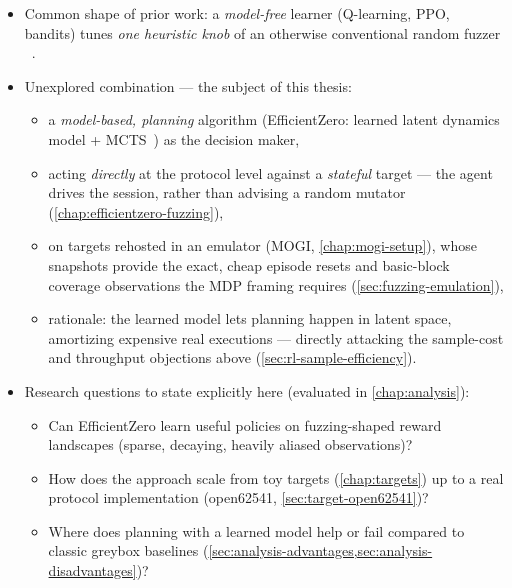 \begin{itemize}
  \item Common shape of prior work: a \emph{model-free} learner (Q-learning, PPO, bandits) tunes
    \emph{one heuristic knob} of an otherwise conventional random fuzzer
    ~\cite{bottinger_deep_2018,binosi_rainfuzz_2023,wang_reinforcement_2021,wang_syzvegas_2021,christakis_banditfuzz_2020}.
  \item Unexplored combination --- the subject of this thesis:
    \begin{itemize}
      \item a \emph{model-based, planning} algorithm (EfficientZero: learned latent dynamics
        model + MCTS~\cite{ye_mastering_2021,schrittwieser_mastering_2020}) as the decision maker,
      \item acting \emph{directly} at the protocol level against a \emph{stateful} target ---
        the agent drives the session, rather than advising a random mutator
        (\cref{chap:efficientzero-fuzzing}),
      \item on targets rehosted in an emulator (MOGI, \cref{chap:mogi-setup}), whose snapshots
        provide the exact, cheap episode resets and basic-block coverage observations the MDP
        framing requires (\cref{sec:fuzzing-emulation}),
      \item rationale: the learned model lets planning happen in latent space, amortizing
        expensive real executions --- directly attacking the sample-cost and throughput
        objections above (\cref{sec:rl-sample-efficiency}).
    \end{itemize}
  \item Research questions to state explicitly here (evaluated in \cref{chap:analysis}):
    \begin{itemize}
      \item Can EfficientZero learn useful policies on fuzzing-shaped reward landscapes
        (sparse, decaying, heavily aliased observations)?
      \item How does the approach scale from toy targets (\cref{chap:targets}) up to a real
        protocol implementation (open62541, \cref{sec:target-open62541})?
      \item Where does planning with a learned model help or fail compared to classic greybox
        baselines (\cref{sec:analysis-advantages,sec:analysis-disadvantages})?
    \end{itemize}
\end{itemize}
